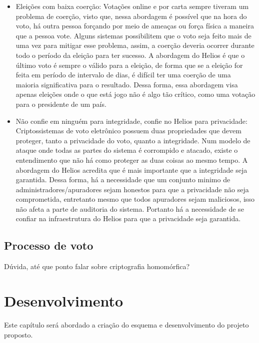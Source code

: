 \documentclass{ufsctex/ufsctex}
\begin{document}
\begin{itemize}

	\item Eleições com baixa coerção: Votações online e por carta sempre
		tiveram um problema de coerção, visto que, nessa abordagem é possível
		que na hora do voto, há outra pessoa forçando por meio de ameaças ou
		força física a maneira que a pessoa vote. Alguns sistemas possibilitem
		que o voto seja feito mais de uma vez para mitigar esse problema,
		assim, a coerção deveria ocorrer durante todo o período da eleição para
		ter sucesso. A abordagem do Helios é que o último voto é sempre o
		válido para a eleição, de forma que se a eleição for feita em período
		de intervalo de dias, é difícil ter uma coerção de uma maioria
		significativa para o resultado. Dessa forma, essa abordagem visa apenas
		eleições onde o que está jogo não é algo tão crítico, como uma votação
		para o presidente de um país.
	\item Não confie em ninguém para integridade, confie no Helios para
		privacidade: Criptossistemas de voto eletrônico possuem duas
		propriedades que devem proteger, tanto a privacidade do voto, quanto a
		integridade. Num modelo de ataque onde todas as partes do sistema é
		corrompido e atacado, existe o entendimento que não há como proteger as
		duas coisas ao mesmo tempo. A abordagem do Helios acredita que é mais
		importante que a integridade seja garantida. Dessa forma, há a
		necessidade que um conjunto minimo de administradores/apuradores sejam
		honestos para que a privacidade não seja comprometida, entretanto mesmo
		que todos apuradores sejam maliciosos, isso não afeta a parte de
		auditoria do sistema. Portanto há a necessidade de se confiar na infraestrutura do Helios
		para que a privacidade seja garantida.

\end{itemize}

\section{Processo de voto}

Dúvida, até que ponto falar sobre criptografia homomórfica?

\chapter{Desenvolvimento}

Este capítulo será abordado a criação do esquema e desenvolvimento do projeto
proposto.
\end{document}
